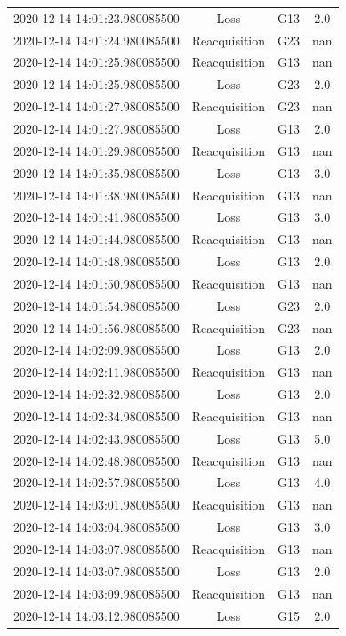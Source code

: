 \begin{enumerate}
\begin{longtabu}{cccc}
2020{-}12{-}14 14:01:23.980085500&Loss&G13&2.0\\%
2020{-}12{-}14 14:01:24.980085500&Reacquisition&G23&nan\\%
2020{-}12{-}14 14:01:25.980085500&Reacquisition&G13&nan\\%
2020{-}12{-}14 14:01:25.980085500&Loss&G23&2.0\\%
2020{-}12{-}14 14:01:27.980085500&Reacquisition&G23&nan\\%
2020{-}12{-}14 14:01:27.980085500&Loss&G13&2.0\\%
2020{-}12{-}14 14:01:29.980085500&Reacquisition&G13&nan\\%
2020{-}12{-}14 14:01:35.980085500&Loss&G13&3.0\\%
2020{-}12{-}14 14:01:38.980085500&Reacquisition&G13&nan\\%
2020{-}12{-}14 14:01:41.980085500&Loss&G13&3.0\\%
2020{-}12{-}14 14:01:44.980085500&Reacquisition&G13&nan\\%
2020{-}12{-}14 14:01:48.980085500&Loss&G13&2.0\\%
2020{-}12{-}14 14:01:50.980085500&Reacquisition&G13&nan\\%
2020{-}12{-}14 14:01:54.980085500&Loss&G23&2.0\\%
2020{-}12{-}14 14:01:56.980085500&Reacquisition&G23&nan\\%
2020{-}12{-}14 14:02:09.980085500&Loss&G13&2.0\\%
2020{-}12{-}14 14:02:11.980085500&Reacquisition&G13&nan\\%
2020{-}12{-}14 14:02:32.980085500&Loss&G13&2.0\\%
2020{-}12{-}14 14:02:34.980085500&Reacquisition&G13&nan\\%
2020{-}12{-}14 14:02:43.980085500&Loss&G13&5.0\\%
2020{-}12{-}14 14:02:48.980085500&Reacquisition&G13&nan\\%
2020{-}12{-}14 14:02:57.980085500&Loss&G13&4.0\\%
2020{-}12{-}14 14:03:01.980085500&Reacquisition&G13&nan\\%
2020{-}12{-}14 14:03:04.980085500&Loss&G13&3.0\\%
2020{-}12{-}14 14:03:07.980085500&Reacquisition&G13&nan\\%
2020{-}12{-}14 14:03:07.980085500&Loss&G13&2.0\\%
2020{-}12{-}14 14:03:09.980085500&Reacquisition&G13&nan\\%
2020{-}12{-}14 14:03:12.980085500&Loss&G15&2.0\\%

\end{longtabu}
\end{enumerate}
